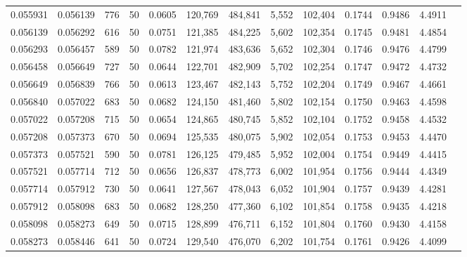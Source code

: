 \begin{tabular}{rrrrrrrrrrrrr}
0.055931 & 0.056139 &   776 &  50 &                                     0.0605 & 120,769 & 484,841 &   5,552 & 102,404 & 0.1744 & 0.9486 & 4.4911 \\
0.056139 & 0.056292 &   616 &  50 &                                     0.0751 & 121,385 & 484,225 &   5,602 & 102,354 & 0.1745 & 0.9481 & 4.4854 \\
0.056293 & 0.056457 &   589 &  50 &                                     0.0782 & 121,974 & 483,636 &   5,652 & 102,304 & 0.1746 & 0.9476 & 4.4799 \\
0.056458 & 0.056649 &   727 &  50 &                                     0.0644 & 122,701 & 482,909 &   5,702 & 102,254 & 0.1747 & 0.9472 & 4.4732 \\
0.056649 & 0.056839 &   766 &  50 &                                     0.0613 & 123,467 & 482,143 &   5,752 & 102,204 & 0.1749 & 0.9467 & 4.4661 \\
0.056840 & 0.057022 &   683 &  50 &                                     0.0682 & 124,150 & 481,460 &   5,802 & 102,154 & 0.1750 & 0.9463 & 4.4598 \\
0.057022 & 0.057208 &   715 &  50 &                                     0.0654 & 124,865 & 480,745 &   5,852 & 102,104 & 0.1752 & 0.9458 & 4.4532 \\
0.057208 & 0.057373 &   670 &  50 &                                     0.0694 & 125,535 & 480,075 &   5,902 & 102,054 & 0.1753 & 0.9453 & 4.4470 \\
0.057373 & 0.057521 &   590 &  50 &                                     0.0781 & 126,125 & 479,485 &   5,952 & 102,004 & 0.1754 & 0.9449 & 4.4415 \\
0.057521 & 0.057714 &   712 &  50 &                                     0.0656 & 126,837 & 478,773 &   6,002 & 101,954 & 0.1756 & 0.9444 & 4.4349 \\
0.057714 & 0.057912 &   730 &  50 &                                     0.0641 & 127,567 & 478,043 &   6,052 & 101,904 & 0.1757 & 0.9439 & 4.4281 \\
0.057912 & 0.058098 &   683 &  50 &                                     0.0682 & 128,250 & 477,360 &   6,102 & 101,854 & 0.1758 & 0.9435 & 4.4218 \\
0.058098 & 0.058273 &   649 &  50 &                                     0.0715 & 128,899 & 476,711 &   6,152 & 101,804 & 0.1760 & 0.9430 & 4.4158 \\
0.058273 & 0.058446 &   641 &  50 &                                     0.0724 & 129,540 & 476,070 &   6,202 & 101,754 & 0.1761 & 0.9426 & 4.4099 \\

\end{tabular}
